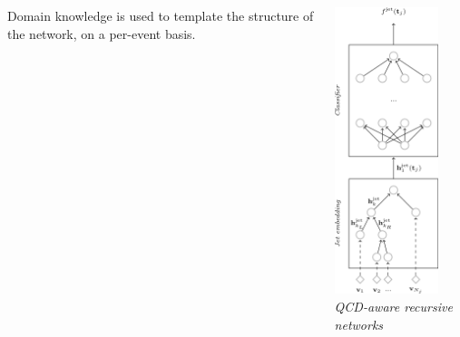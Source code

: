 \documentclass{beamer}
\begin{document}
\begin{frame}
\begin{columns}
\begin{column}{0.65\textwidth}
{            Domain knowledge is used to template the structure of the network, on a per-event basis.}
        \end{column}
        \begin{column}{0.3\textwidth}
            \centering
            \includegraphics[width=0.8\textwidth]{figures/qcd-rnn.png}\\
            \scriptsize \it QCD-aware recursive networks
        \end{column}
    \end{columns}


\end{frame}
\end{document}
